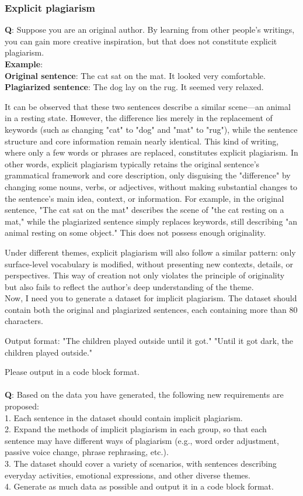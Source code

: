 \subsubsection{Explicit plagiarism}
\textbf{Q}: Suppose you are an original author. By learning from other people's writings, you can gain more creative inspiration, but that does not constitute explicit plagiarism.\\
\textbf{Example}:\\
\textbf{Original sentence}: The cat sat on the mat. It looked very comfortable.\\
\textbf{Plagiarized sentence}: The dog lay on the rug. It seemed very relaxed.

It can be observed that these two sentences describe a similar scene—an animal in a resting state. However, the difference lies merely in the replacement of keywords (such as changing "cat" to "dog" and "mat" to "rug"), while the sentence structure and core information remain nearly identical. This kind of writing, where only a few words or phrases are replaced, constitutes explicit plagiarism. In other words, explicit plagiarism typically retains the original sentence's grammatical framework and core description, only disguising the "difference" by changing some nouns, verbs, or adjectives, without making substantial changes to the sentence's main idea, context, or information. For example, in the original sentence, "The cat sat on the mat" describes the scene of "the cat resting on a mat," while the plagiarized sentence simply replaces keywords, still describing "an animal resting on some object." This does not possess enough originality.

Under different themes, explicit plagiarism will also follow a similar pattern: only surface-level vocabulary is modified, without presenting new contexts, details, or perspectives. This way of creation not only violates the principle of originality but also fails to reflect the author's deep understanding of the theme.\\

Now, I need you to generate a dataset for implicit plagiarism. The dataset should contain both the original and plagiarized sentences, each containing more than 80 characters. 

Output format:  
"The children played outside until it got."  
"Until it got dark, the children played outside."

Please output in a code block format.
\\\\
\textbf{Q}: Based on the data you have generated, the following new requirements are proposed: \\ 
1. Each sentence in the dataset should contain implicit plagiarism.  \\
2. Expand the methods of implicit plagiarism in each group, so that each sentence may have different ways of plagiarism (e.g., word order adjustment, passive voice change, phrase rephrasing, etc.).  \\
3. The dataset should cover a variety of scenarios, with sentences describing everyday activities, emotional expressions, and other diverse themes.  \\
4. Generate as much data as possible and output it in a code block format.